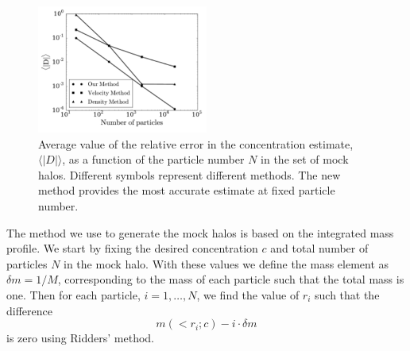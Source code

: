 \documentclass[a4,useAMS,usenatbib,usegraphicx]{mn2e}
\newcommand{\avg}[1]{\langle{#1}\rangle}
\begin{document}
\begin{figure}
\begin{center}
  \includegraphics[width=0.50\textwidth]{error.pdf}
\end{center}
\vspace{-0.5cm}
\caption{Average value of the relative error in the concentration
  estimate, $\avg{|D|}$, as a function of the particle number $N$ in
  the set of mock halos. Different symbols represent different
  methods. The new method provides the most accurate estimate at fixed
  particle number.  
    \label{fig:error}}
\end{figure}









The method we use to generate the mock halos is based on the
integrated mass profile.  
We start by fixing the desired concentration $c$ and total number of
particles $N$ in the mock halo.  
With these values we define the mass element as $\delta m = 1/M$, corresponding
to the mass of each particle such that the total mass is one.   
Then for each particle, $i=1,\ldots,N$, we find the value of $r_i$
such that the difference 
% 
\begin{equation}
m(<r_i;c) - i \cdot \delta m
\end{equation}
%
is zero using Ridders' method.
\end{document}
